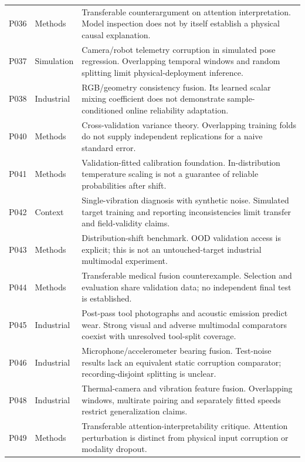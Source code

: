 \begin{longtable}{@{}P{.25\textwidth}P{.16\textwidth}P{.53\textwidth}@{}}
P036 \citep{P036} & Methods & Transferable counterargument on attention interpretation.
Model inspection does not by itself establish a physical causal explanation. \\
P037 \citep{Altinses2023Fuzzy} & Simulation & Camera/robot telemetry corruption in
simulated pose regression. Overlapping temporal windows and random splitting limit
physical-deployment inference. \\
P038 \citep{P038} & Industrial & RGB/geometry consistency fusion. Its learned scalar
mixing coefficient does not demonstrate sample-conditioned online reliability
adaptation. \\
P040 \citep{Bengio2004CVVariance} & Methods & Cross-validation variance theory.
Overlapping training folds do not supply independent replications for a naive standard
error. \\
P041 \citep{Guo2017Calibration} & Methods & Validation-fitted calibration foundation.
In-distribution temperature scaling is not a guarantee of reliable probabilities after
shift. \\
P042 \citep{P042} & Context & Single-vibration diagnosis with synthetic noise. Simulated
target training and reporting inconsistencies limit transfer and field-validity claims.
\\
P043 \citep{P043} & Methods & Distribution-shift benchmark. OOD validation access is
explicit; this is not an untouched-target industrial multimodal experiment. \\
P044 \citep{P044} & Methods & Transferable medical fusion counterexample. Selection and
evaluation share validation data; no independent final test is established. \\
P045 \citep{P045} & Industrial & Post-pass tool photographs and acoustic emission
predict wear. Strong visual and adverse multimodal comparators coexist with unresolved
tool-split coverage. \\
P046 \citep{P046} & Industrial & Microphone/accelerometer bearing fusion. Test-noise
results lack an equivalent static corruption comparator; recording-disjoint splitting is
unclear. \\
P048 \citep{P048} & Industrial & Thermal-camera and vibration feature fusion.
Overlapping windows, multirate pairing and separately fitted speeds restrict
generalization claims. \\
P049 \citep{P049} & Methods & Transferable attention-interpretability critique.
Attention perturbation is distinct from physical input corruption or modality dropout.
\\

\end{longtable}
